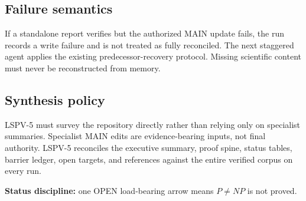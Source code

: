 \documentclass[11pt]{article}
\begin{document}
\subsection*{Failure semantics}

If a standalone report verifies but the authorized MAIN update fails, the run records a write
failure and is not treated as fully reconciled. The next staggered agent applies the existing
predecessor-recovery protocol. Missing scientific content must never be reconstructed from memory.

\subsection*{Synthesis policy}

LSPV-5 must survey the repository directly rather than relying only on specialist summaries.
Specialist MAIN edits are evidence-bearing inputs, not final authority. LSPV-5 reconciles the
executive summary, proof spine, status tables, barrier ledger, open targets, and references against
the entire verified corpus on every run.

\textbf{Status discipline:} one OPEN load-bearing arrow means $P\neq NP$ is not proved.
\end{document}
